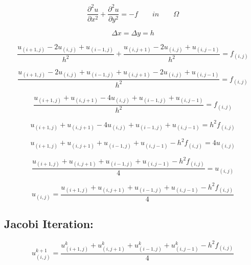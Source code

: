 \documentclass[11pt]{article}
\begin{document}
    \[\frac{\partial^2 u}{\partial x^2 } + \frac{\partial^2 u}{\partial y^2 } = -f\qquad in \qquad \Omega\]

    \[\Delta x = \Delta y = h\]

    \[\frac{u_{(i+1,j)} - 2u_{(i,j)} + u_{(i-1,j)}}{h^2 } + \frac{u_{(i,j+1)} - 2u_{(i,j)} + u_{(i,j-1)}}{h^2 } = f_{(i,j)}\]

    \[\frac{u_{(i+1,j)} - 2u_{(i,j)} + u_{(i-1,j)} + u_{(i,j+1)} - 2u_{(i,j)} + u_{(i,j-1)}}{h^2 } = f_{(i,j)}\]

    \[\frac{u_{(i+1,j)} + u_{(i,j+1)} - 4u_{(i,j)} + u_{(i-1,j)} + u_{(i,j-1)}}{h^2 } = f_{(i,j)}\]

    \[u_{(i+1,j)} + u_{(i,j+1)} - 4u_{(i,j)} + u_{(i-1,j)} + u_{(i,j-1)} = h^2f_{(i,j)}\]

    \[u_{(i+1,j)} + u_{(i,j+1)} + u_{(i-1,j)} + u_{(i,j-1)} - h^2f_{(i,j)}= 4u_{(i,j)}\]

    \[\frac{u_{(i+1,j)} + u_{(i,j+1)} + u_{(i-1,j)} + u_{(i,j-1)} - h^2f_{(i,j)}}{4}= u_{(i,j)}\]

    \[u_{(i,j)} = \frac{u_{(i+1,j)} + u_{(i,j+1)} + u_{(i-1,j)} + u_{(i,j-1)} - h^2f_{(i,j)}}{4}\]

    \hypertarget{jacobi-iteration}{%
\subsection{Jacobi Iteration:}\label{jacobi-iteration}}

    \[u^{k+1}_{(i,j)} = \frac{u^{k}_{(i+1,j)} + u^{k}_{(i,j+1)} + u^{k}_{(i-1,j)} + u^{k}_{(i,j-1)} - h^2f_{(i,j)}}{4}\]
\end{document}
